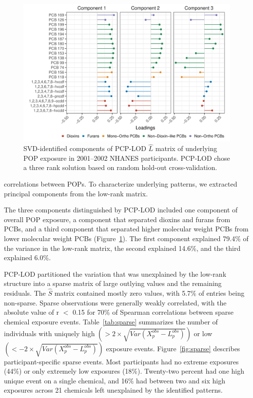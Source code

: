 \begin{landscape}
\begin{figure}
    \centering
\includegraphics[scale=0.55]{figures/loadings.pdf}
   \caption[Components underlying $\hat{L}$ of POPs in NHANES 2001--2002]{SVD-identified components of PCP-LOD $\hat{L}$ matrix of underlying POP exposure in 2001--2002 NHANES participants. PCP-LOD chose a three rank solution based on random hold-out cross-validation.}
    \label{fig:nhanes_load}
\end{figure}
\end{landscape}

\noindent correlations between POPs. To characterize underlying patterns, we extracted principal components from the low-rank matrix.

The three components distinguished by PCP-LOD included one component of overall POP exposure, a component that separated dioxins and furans from PCBs, and a third component that separated higher molecular weight PCBs from lower molecular weight PCBs (Figure~\ref{fig:nhanes_load}). The first component explained 79.4\% of the variance in the low-rank matrix, the second explained 14.6\%, and the third explained 6.0\%.

PCP-LOD partitioned the variation that was unexplained by the low-rank structure into a sparse matrix of large outlying values and the remaining residuals. The $\hat{S}$ matrix contained mostly zero values, with 5.7\% of entries being non-sparse. Sparse observations were generally weakly correlated, with the absolute value of r $<$ 0.15 for 70\% of Spearman correlations between sparse chemical exposure events. Table~\ref{tab:sparse} summarizes the number of individuals with uniquely high $\left(> 2 \times \sqrt{Var(X_{p}^{obs} - L_{p}^{obs})}\right)$ or low $\left(< -2 \times \sqrt{Var(X_{p}^{obs} - L_{p}^{obs})}\right)$ exposure events. Figure~\ref{fig:sparse} describes participant-specific sparse events. Most participants had no extreme exposures (44\%) or only extremely low exposures (18\%). Twenty-two percent had one high unique event on a single chemical, and 16\% had between two and six high exposures across 21 chemicals left unexplained by the identified patterns.
  
